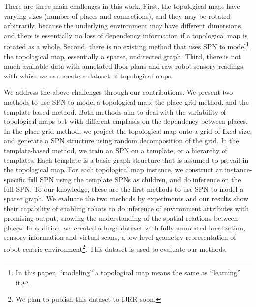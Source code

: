 \documentclass[10pt, titlepage]{article}
\theoremstyle{definition}
\begin{document}

There are three main challenges in this work. First, the topological maps have varying sizes (number of places and connections), and they may be rotated arbitrarily, because the underlying environment may have different dimensions, and there is essentially no loss of dependency information if a topological map is rotated as a whole. Second, there is no existing method that uses SPN to model\footnote{In this paper, ``modeling'' a topological map means the same as ``learning'' it.} the topological map, essentially a sparse, undirected graph. Third, there is not much available data with annotated floor plans and raw robot sensory readings with which we can create a dataset of topological maps. 


We address the above challenges through our contributions. We present two methods to use SPN to model a topological map: the place grid method, and the template-based method. Both methods aim to deal with the variability of topological maps but with different emphasis on the dependency between places. In the place grid method, we project the topological map onto a grid of fixed size, and generate a SPN structure using random decomposition of the grid. In the template-based method, we train an SPN on a template, or a hierarchy of templates. Each template is a basic graph structure that is assumed to prevail in the topological map. For each topological map instance, we construct an instance-specific full SPN using the template SPNs as children, and do inference on the full SPN. To our knowledge, these are the first methods to use SPN to model a sparse graph. We evaluate the two methods by experiments and our results show their capability of enabling robots to do inference of environment attributes with promising output, showing the understanding of the spatial relations between places. In addition, we created a large dataset with fully annotated localization, sensory information and virtual scans, a low-level geometry representation of robot-centric environment\footnote{We plan to publish this dataset to IJRR soon.}. This dataset is used to evaluate our methods.
\end{document}
